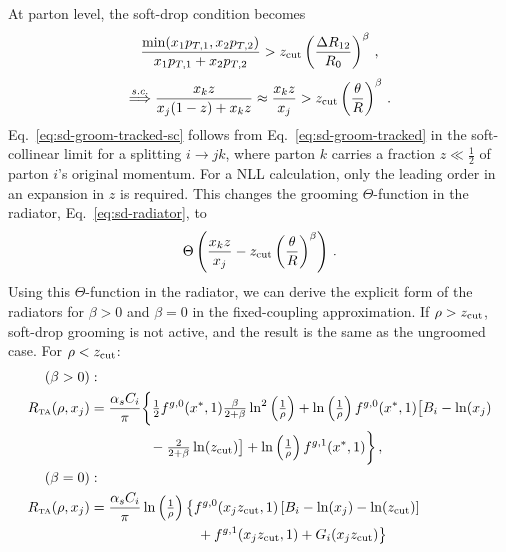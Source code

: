 \documentclass[letterpaper,11pt]{article}
\newcommand{\Eq}[1]{Eq.~\eqref{#1}}
\begin{document}
At parton level, the soft-drop condition becomes
\begin{equation}
\label{eq:sd-groom-tracked}
\frac{\min(x_1 p_{T,1},x_2p_{T,2})}{x_1p_{T,1}+x_2p_{T,2}} > z_{\rm cut} \left(\frac{\Delta R_{12}}{R_0}\right)^\beta\,,
\end{equation}
\begin{equation}
\label{eq:sd-groom-tracked-sc}
\overset{s.c.}{\Longrightarrow} \frac{x_kz}{x_j(1-z)+x_kz} \approx \frac{x_kz}{x_j}> z_{\rm cut} \left(\frac{\theta}{R}\right)^\beta\,. 
\end{equation}
\Eq{eq:sd-groom-tracked-sc} follows from \Eq{eq:sd-groom-tracked} in the soft-collinear limit for a splitting $i\rightarrow jk$, where parton $k$ carries a fraction $z\ll \tfrac{1}{2}$ of parton $i$'s original momentum. 
%
For a NLL calculation, only the leading order in an expansion in $z$ is required. 
%
This changes the grooming $\Theta$-function in the radiator, \Eq{eq:sd-radiator}, to
\begin{equation}
\Theta\left(\frac{x_kz}{x_j} - z_{\rm cut} \left(\frac{\theta}{R}\right)^\beta \right) \,.
\end{equation}
Using this $\Theta$-function in the radiator, we can derive the explicit form of the radiators for $\beta > 0$ and $\beta = 0$ in the fixed-coupling approximation. 
%
If $\rho > z_{\rm cut}$, soft-drop grooming is not active, and the result is the same as the ungroomed case. For $\rho < z_{\rm cut}$:
\begin{align}
\label{eq:track-first-radiator-betagt0}
(\beta > 0) &:\\ \nonumber
R_{\mbox{\tiny TA}}(\rho,x_j) &= \frac{\alpha_sC_i}{\pi} \bigg\{ \tfrac{1}{2}f^{g,0}(x^*,1) \tfrac{\beta}{2+\beta} \ln^2\left(\tfrac{1}{\rho}\right) + \ln\left(\tfrac{1}{\rho}\right)f^{g,0}(x^*,1) \big[B_i-\ln(x_j)\\ \nonumber
&\hspace{1.5cm} - \tfrac{2}{2+\beta}\ln(z_{\rm cut})  \big] + \ln\left(\tfrac{1}{\rho}\right)f^{g,1}(x^*,1)\bigg\}\,, \\
%
\label{eq:track-first-radiator-betaeq0}
(\beta = 0) &:\\ \nonumber
R_{\mbox{\tiny TA}}(\rho,x_j) &= \frac{\alpha_sC_i}{\pi} \ln\left(\tfrac{1}{\rho}\right) \big\{f^{g,0}(x_jz_{\rm cut},1) \left[B_i - \ln(x_j) - \ln(z_{\rm cut})\right]\\
&\hspace{2.7cm} + f^{g,1}(x_jz_{\rm cut},1) + G_i(x_jz_{\rm cut}) \big\}
\end{align}
\end{document}
